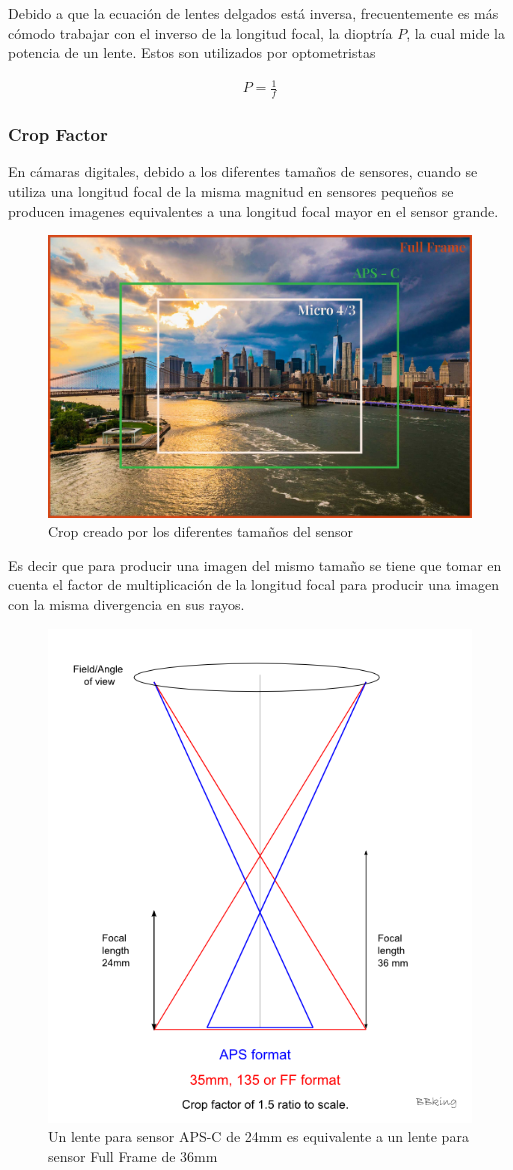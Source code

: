 \documentclass{article}
\begin{document}
Debido a que la ecuación de lentes delgados está inversa, frecuentemente es más cómodo trabajar con el inverso de la longitud focal, la dioptría $P$, la cual mide la potencia de un lente. Estos son utilizados por optometristas

\begin{align*}
	P = \frac{1}{f}
\end{align*}

\subsubsection{Crop Factor}

En cámaras digitales, debido a los diferentes tamaños de sensores, cuando se utiliza una longitud focal de la misma magnitud en sensores pequeños se producen imagenes equivalentes a una longitud focal mayor en el sensor grande.

\begin{figure}[H]
	\centering
	\includegraphics[width=0.70\linewidth]{Figuras/Crop_Factor_Crop}
	\caption{Crop creado por los diferentes tamaños del sensor}
	\label{fig:cropfactorcrop}
\end{figure}

Es decir que para producir una imagen del mismo tamaño se tiene que tomar en cuenta el factor de multiplicación de la longitud focal para producir una imagen con la misma divergencia en sus rayos.

\begin{figure}[H]
	\centering
	\includegraphics[width=0.60\linewidth]{Figuras/Crop_Factor_Focal_Length}
	\caption{Un lente para sensor APS-C de 24mm es equivalente a un lente para sensor Full Frame de 36mm}
	\label{fig:cropfactorfocallength}
\end{figure}
\end{document}
